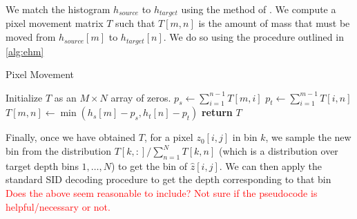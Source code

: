 We match the histogram $h_{source}$ to $h_{target}$ using the method of
\cite{Morovic2002}. We compute a pixel movement
matrix $T$ such that $T[m, n]$ is the amount of mass that must be moved from $h_{source}[m]$
to $h_{target}[n]$. We do so using the procedure outlined in \ref{alg:ehm}

\begin{algorithm}[H]
 \caption{Pixel Movement} 
 \label{alg:ehm}
 \begin{algorithmic}
    \State Initialize $T$ as an $M \times N$ array of zeros.
        \State $p_s \gets \sum_{i=1}^{n-1} T[m, i]$
        \State $p_t \gets \sum_{i=1}^{m-1} T[i, n]$
        \State $T[m, n] \gets \min(h_s[m] - p_s, h_t[n] - p_t)$
      \EndFor
    \EndFor
    \State \textbf{return} $T$
  \EndProcedure
 \end{algorithmic}
\end{algorithm}

Finally, once we have obtained $T$, for a pixel $z_0[i, j]$ in bin $k$, we sample the new bin from the
distribution $T[k, :]/\sum_{n=1}^NT[k,n]$ (which is a distribution over target
depth bins $1,\ldots,N$) to get the bin of $\hat z[i,j]$. We can then apply the
standard SID decoding procedure to get the depth corresponding to that bin
\textcolor{red}{Does the above seem reasonable to include? Not sure if the
  pseudocode is helpful/necessary or not.}


